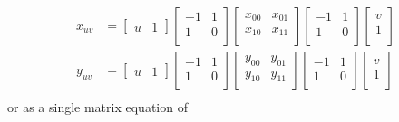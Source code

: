 \documentclass{report}
\begin{document}
\begin{equation*}\begin{split}
x_{uv} &= 
\begin{bmatrix}u & 1\end{bmatrix}
\begin{bmatrix}-1 & 1\\ 1 & 0\\\end{bmatrix}
\begin{bmatrix}x_{00} & x_{01} \\ x_{10} & x_{11}\\\end{bmatrix}
\begin{bmatrix}-1 & 1\\ 1 & 0\\\end{bmatrix}
\begin{bmatrix}v \\ 1\\\end{bmatrix}\\
y_{uv} &= 
\begin{bmatrix}u & 1\end{bmatrix}
\begin{bmatrix}-1 & 1\\ 1 & 0\\\end{bmatrix}
\begin{bmatrix}y_{00} & y_{01} \\ y_{10} & y_{11}\\\end{bmatrix}
\begin{bmatrix}-1 & 1\\ 1 & 0\\\end{bmatrix}
\begin{bmatrix}v \\ 1\\\end{bmatrix}\\
\end{split}\end{equation*}
or as a single matrix equation of 
\end{document}
